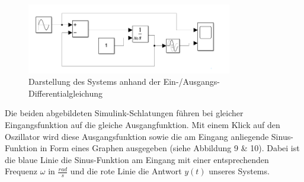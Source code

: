  \begin{figure}[H]
    \centering
    \includegraphics[width=0.8\textwidth]{Bilder/SimulinkKomplex.png}
    \caption{Darstellung des Systems anhand der Ein-/Ausgangs-Differentialgleichung}
 \end{figure}
Die beiden abgebildeten Simulink-Schlatungen führen bei gleicher Eingangsfunktion auf die gleiche Ausgangfunktion.
Mit einem Klick auf den Oszillator wird diese Ausgangsfunktion sowie die am Eingang anliegende Sinus-Funktion in Form eines Graphen ausgegeben (siehe Abbildung 9 \& 10). Dabei ist die blaue Linie die Sinus-Funktion am Eingang mit einer entsprechenden Frequenz $\omega$ in $\frac{rad}{s}$ und die rote Linie die Antwort $y(t)$ unseres Systems.

